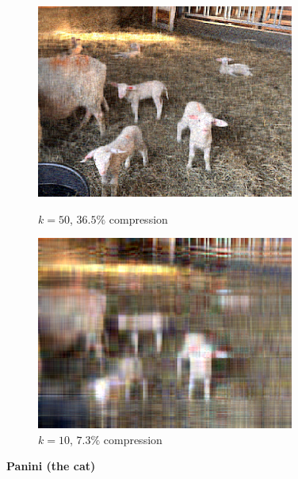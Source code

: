 \documentclass[12pt, letterpaper]{article}
\theoremstyle{definition}
\theoremstyle{remark}
\begin{document}
\begin{figure}[H]
  \centering
  \begin{minipage}[b]{0.4\textwidth}
    \includegraphics[width=\textwidth]{images/compressed_sheep_50.png}
    \caption{$k = 50$, $36.5\%$ compression}
  \end{minipage}
  \hfill
  \begin{minipage}[b]{0.4\textwidth}
    \includegraphics[width=\textwidth]{images/compressed_sheep_10.png}
    \caption{$k = 10$, $7.3\%$ compression}
  \end{minipage}
\end{figure}

\begin{center}
    \textbf{Panini (the cat)}
\end{center}
\end{document}

